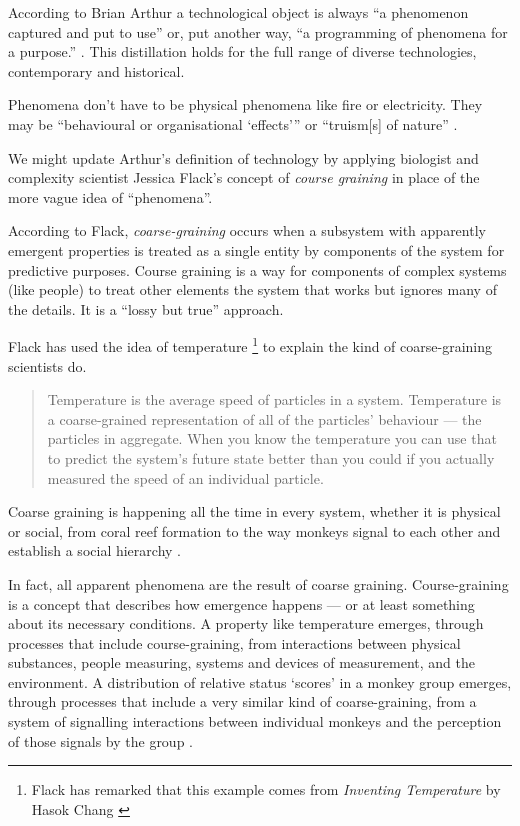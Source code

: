 \documentclass[letterpaper]{article}
\begin{document}
    According to Brian Arthur a technological object is always “a phenomenon captured and put to use” \citep[p.53]{theNatureOfTechnology2009} or, put another way, “a programming of phenomena for a purpose.” \citep[p.53]{theNatureOfTechnology2009}. This distillation holds for the full range of diverse technologies, contemporary and historical.

    Phenomena don't have to be physical phenomena like fire or electricity. They may be “behavioural or organisational ‘effects’” \citep[p.55]{theNatureOfTechnology2009} or “truism[s] of nature” \citep[p.45]{theNatureOfTechnology2009}.
    
    We might update Arthur's definition of technology by applying biologist and complexity scientist Jessica Flack's concept of \emph{course graining} in place of the more vague idea of “phenomena”. 

    According to Flack, \emph{coarse-graining} occurs when a subsystem with apparently emergent properties is treated as a single entity by components of the system for predictive purposes. Course graining is a way for components of complex systems (like people) to treat other elements the system that works but ignores many of the details. It is a “lossy but true” \citep[p.4]{FlackCrsGrnng2017} approach.
    
    Flack has used the idea of temperature \footnote{

        Flack has remarked that this example comes from \emph{Inventing Temperature} by Hasok Chang \citep{ChangInvntngTmprtr2004}

    } to explain the kind of coarse-graining scientists do.

    \begin{quote}
        Temperature is the average speed of particles in a system. Temperature is a coarse-grained representation of all of the particles' behaviour — the particles in aggregate. When you know the temperature you can use that to predict the system's future state better than you could if you actually measured the speed of an individual particle. \citep[p.4]{FlackCrsGrnng2017}
    \end{quote}

    Coarse graining is happening all the time in every system, whether it is physical or social, from coral reef formation \citep[p.61]{FlackEtAlTmsclsSymmtryUncrtnty2013} to the way monkeys signal to each other and establish a social hierarchy \citep{FlackCntxtMdltsSgnlMnng2007}.

    In fact, all apparent phenomena are the result of coarse graining. Course-graining is a concept that describes how emergence happens — or at least something about its necessary conditions. A property like temperature emerges, through processes that include course-graining, from interactions between physical substances, people measuring, systems and devices of measurement, and the environment. A distribution of relative status ‘scores’ in a monkey group emerges, through processes that include a very similar kind of coarse-graining, from a system of signalling interactions between individual monkeys and the perception of those signals by the group \citep{FlackCntxtMdltsSgnlMnng2007}.
    
\end{document}
